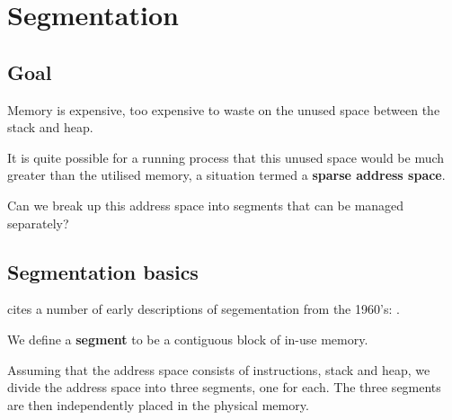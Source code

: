 \chapter{Segmentation}
\label{ch:segmentation}



\section{Goal}

Memory is expensive, too expensive to waste on the unused space between the stack and heap.

It is quite possible for a running process that this unused space would be much greater than the utilised memory, a situation termed a \textbf{sparse address space}.

Can we break up this address space into segments that can be managed separately?

\section{Segmentation basics}

\citet[Chapter 16]{arpaci-dusseau:2015:operating} cites a number of early descriptions of segementation from the 1960's: \citet{greenfield:1962:fact}.

We define a \textbf{segment} to be a contiguous block of in-use memory.

Assuming that the address space consists of instructions, stack and heap, we divide the address space into three segments, one for each.
The three segments are then independently placed in the physical memory.

